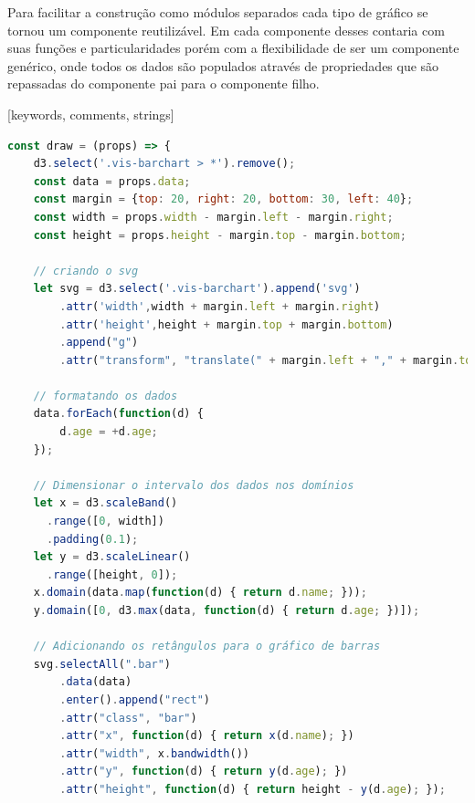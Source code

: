{{{Para facilitar a construção como módulos separados cada tipo de gráfico se tornou um componente reutilizável. Em cada componente desses contaria com suas funções e particularidades porém com a flexibilidade de ser um componente genérico, onde todos os dados são populados através de propriedades que são repassadas do componente pai para o componente filho. 

[keywords, comments, strings]

{\begin{lstlisting}[language=javascript,caption=exemplo de um componente de gráfico]
const draw = (props) => {
    d3.select('.vis-barchart > *').remove();
    const data = props.data;
    const margin = {top: 20, right: 20, bottom: 30, left: 40};
    const width = props.width - margin.left - margin.right;
    const height = props.height - margin.top - margin.bottom;
    
    // criando o svg
    let svg = d3.select('.vis-barchart').append('svg')
        .attr('width',width + margin.left + margin.right)
        .attr('height',height + margin.top + margin.bottom)
        .append("g")
        .attr("transform", "translate(" + margin.left + "," + margin.top + ")");

    // formatando os dados
    data.forEach(function(d) {
        d.age = +d.age;
    });

    // Dimensionar o intervalo dos dados nos domínios
    let x = d3.scaleBand()
      .range([0, width])
      .padding(0.1);
    let y = d3.scaleLinear()
      .range([height, 0]);
    x.domain(data.map(function(d) { return d.name; }));
    y.domain([0, d3.max(data, function(d) { return d.age; })]);

    // Adicionando os retângulos para o gráfico de barras
    svg.selectAll(".bar")
        .data(data)
        .enter().append("rect")
        .attr("class", "bar")
        .attr("x", function(d) { return x(d.name); })
        .attr("width", x.bandwidth())
        .attr("y", function(d) { return y(d.age); })
        .attr("height", function(d) { return height - y(d.age); });


\end{lstlisting}}}}}
